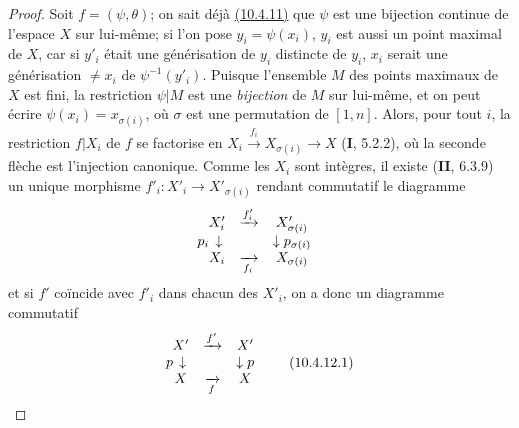 \begin{proof}
Soit $f=(\psi,\theta)$; on sait déjà
{\hyperref[canon-index.ega4.c04.statement.10-4-11]{(10.4.11)}} que $\psi$ est une
bijection continue de l'espace $X$ sur lui-même; si l'on pose
$y_i=\psi(x_i)$, $y_i$ est aussi un point maximal de $X$, car si $y'_i$
était une générisation de $y_i$ distincte de $y_i$, $x_i$ serait une
générisation $\neq x_i$ de $\psi^{-1}(y'_i)$. Puisque l'ensemble $M$
des points maximaux de $X$ est fini, la restriction $\psi|M$ est une
\emph{bijection} de $M$ sur lui-même, et on peut écrire
$\psi(x_i)=x_{\sigma(i)}$, où $\sigma$ est une permutation de
$[1,n]$. Alors, pour tout $i$, la restriction $f|X_i$ de $f$ se
factorise en $X_i\xrightarrow{f_i}X_{\sigma(i)}\longrightarrow X$
(\textbf{I}, 5.2.2), où la seconde flèche est l'injection canonique. Comme les
$X_i$ sont intègres, il existe (\textbf{II}, 6.3.9) un unique morphisme
$f'_i:X'_i\to X'_{\sigma(i)}$ rendant commutatif le diagramme
\[
\begin{array}{ccc}
X'_i&\xrightarrow{f'_i}&X'_{\sigma(i)}\\
\llap{$p_i$\,}\downarrow&&\downarrow p_{\sigma(i)}\\
X_i&\xrightarrow[f_i]{}&X_{\sigma(i)}
\end{array}
\]
et si $f'$ coïncide avec $f'_i$ dans chacun des $X'_i$, on a donc un
diagramme commutatif
\begin{equation}
\label{IV.10.4.12.1.errata}
\begin{array}{ccc}
X'&\xrightarrow{f'}&X'\\
\llap{$p$\,}\downarrow&&\downarrow p\\
X&\xrightarrow[f]{}&X
\end{array}
\tag{10.4.12.1}
\end{equation}


\end{proof}
